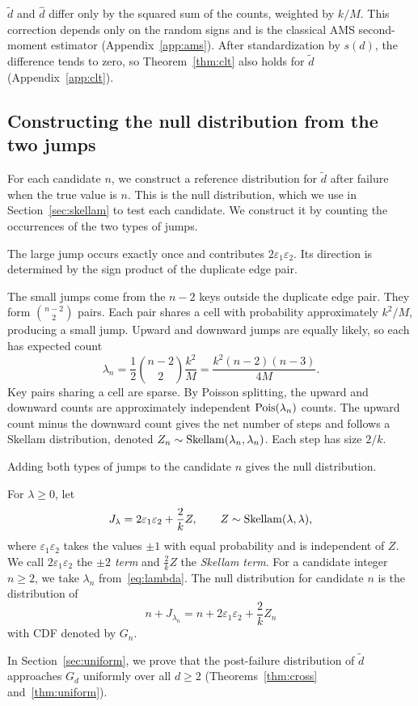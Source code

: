 $\widetilde d$ and $\widehat d$ differ only by the squared sum of the counts, weighted by $k/M$. This correction depends only on the random signs and is the classical AMS second-moment estimator\cite{alon1999spacecomplexity} (Appendix~\ref{app:ams}). After standardization by $s(d)$, the difference tends to zero, so Theorem~\ref{thm:clt} also holds for $\widetilde d$ (Appendix~\ref{app:clt}).

\subsection{Constructing the null distribution from the two jumps}\label{sec:aux}
For each candidate $n$, we construct a reference distribution for $\widetilde d$ after failure when the true value is $n$. This is the null distribution, which we use in Section~\ref{sec:skellam} to test each candidate. We construct it by counting the occurrences of the two types of jumps.

The large jump occurs exactly once and contributes $2\varepsilon_1\varepsilon_2$. Its direction is determined by the sign product of the duplicate edge pair.

The small jumps come from the $n-2$ keys outside the duplicate edge pair. They form $\binom{n-2}2$ pairs. Each pair shares a cell with probability approximately $k^2/M$, producing a small jump. Upward and downward jumps are equally likely, so each has expected count
\begin{equation}
\lambda_n=\frac12\binom{n-2}2\frac{k^2}M=\frac{k^2(n-2)(n-3)}{4M}.\label{eq:lambda}
\end{equation}
Key pairs sharing a cell are sparse. By Poisson splitting\cite{kingman1993poisson}, the upward and downward counts are approximately independent $\operatorname{Pois}(\lambda_n)$ counts. The upward count minus the downward count gives the net number of steps and follows a Skellam distribution\cite{skellam1946}, denoted $Z_n\sim\operatorname{Skellam}(\lambda_n,\lambda_n)$. Each step has size $2/k$.

Adding both types of jumps to the candidate $n$ gives the null distribution.
\begin{definition}\label{def:null}
For $\lambda\ge0$, let
\begin{equation}
J_\lambda=2\varepsilon_1\varepsilon_2+\frac2kZ,\qquad Z\sim\operatorname{Skellam}(\lambda,\lambda),\label{eq:J}
\end{equation}
where $\varepsilon_1\varepsilon_2$ takes the values $\pm1$ with equal probability and is independent of $Z$. We call $2\varepsilon_1\varepsilon_2$ the \textit{$\pm2$ term} and $\frac2kZ$ the \textit{Skellam term}. For a candidate integer $n\ge2$, we take $\lambda_n$ from~\eqref{eq:lambda}. The null distribution for candidate $n$ is the distribution of
\begin{equation}
n+J_{\lambda_n}=n+2\varepsilon_1\varepsilon_2+\frac2kZ_n\label{eq:aux}
\end{equation}
with CDF denoted by $G_n$.
\end{definition}
In Section~\ref{sec:uniform}, we prove that the post-failure distribution of $\widetilde d$ approaches $G_d$ uniformly over all $d\ge2$ (Theorems~\ref{thm:cross} and~\ref{thm:uniform}).

